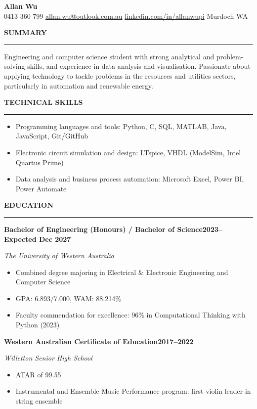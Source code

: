 \documentclass[11pt,a4paper]{article}
\newcommand{\cvsection}[1]{%
    \vspace{3pt}
    \noindent\textbf{\MakeUppercase{#1}}\par
    \vspace{4pt}
    \hrule
    \vspace{3pt}
}
\newcommand{\cvitemlong}[3]{%
    \noindent\textbf{#1}\hfill\textbf{#2}\par\textit{#3}
}
\begin{document}
\begin{center}
    {\LARGE\textbf{Allan Wu}}\\[4pt]
    0413 360 799
    \textbar{}
    \href{mailto:allan.wu@outlook.com.au}{allan.wu@outlook.com.au}
    \textbar{}
    \href{https://www.linkedin.com/in/allanwupi}{linkedin.com/in/allanwupi}
    \textbar{}
    Murdoch WA
\end{center}
\vspace{-2.5mm}

\cvsection{Summary}

Engineering and computer science student with strong analytical and
problem-solving skills, and experience in data analysis and visualisation.
Passionate about applying technology to tackle problems in the resources
and utilities sectors, particularly in automation and renewable energy.

\cvsection{Technical Skills}

\begin{itemize}
    \item Programming languages and tools: Python, C, SQL, MATLAB, Java, JavaScript, Git/GitHub
    \item Electronic circuit simulation and design: LTspice, VHDL (ModelSim, Intel Quartus Prime)
    \item Data analysis and business process automation: Microsoft Excel, Power BI, Power Automate
\end{itemize}

\cvsection{Education}

\cvitemlong%
    {Bachelor of Engineering (Honours) / Bachelor of Science}%
    {2023--Expected Dec 2027}%
    {The University of Western Australia}

\begin{itemize}
    \item Combined degree majoring in Electrical \& Electronic Engineering and Computer Science
    \item GPA\@: 6.893/7.000, WAM\@: 88.214\%
    \item Faculty commendation for excellence: 96\% in Computational Thinking with Python (2023)
\end{itemize}

\cvitemlong%
    {Western Australian Certificate of Education}%
    {2017--2022}%
    {Willetton Senior High School}

\begin{itemize}
    \item ATAR of 99.55
    \item Instrumental and Ensemble Music Performance program: first violin leader in string ensemble
\end{itemize}
\end{document}
